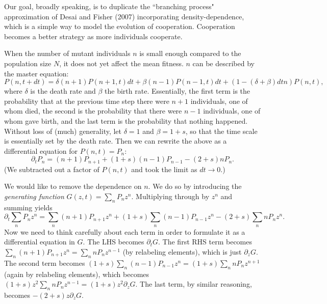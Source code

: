 \documentclass[10pt]{revtex4}
\begin{document}
Our goal, broadly speaking, is to duplicate the ``branching process" approximation of Desai and Fisher (2007) incorporating density-dependence, which is a simple way to model the evolution of cooperation.
Cooperation becomes a better strategy as more individuals cooperate.

When the number of mutant individuals $n$ is small enough compared to the population size $N$, it does not yet affect the mean fitness.
$n$ can be described by the master equation:
\begin{equation}
P(n,t+dt) = \delta(n+1)P(n+1,t)dt + \beta(n-1)P(n-1,t)dt + (1-(\delta + \beta)dt n)P(n,t),
\end{equation}
where $\delta$ is the death rate and $\beta$ the birth rate.
Essentially, the first term is the probability that at the previous time step there were $n+1$ individuals, one of whom died, the second is the probability that there were $n-1$ individuals, one of whom gave birth, and the last term is the probability that nothing happened.
Without loss of (much) generality, let $\delta = 1$ and $\beta = 1+s$, so that the time scale is essentially set by the death rate.
Then we can rewrite the above as a differential equation for $P(n,t) = P_n$:
\begin{equation}
\partial_t P_n = (n+1)P_{n+1} + (1+s)(n-1)P_{n-1} - (2+s) nP_n.
\end{equation}
(We subtracted out a factor of $P(n,t)$ and took the limit as $dt \to 0$.)

We would like to remove the dependence on $n$.
We do so by introducing the \emph{generating function} $G(z,t) = \sum_n P_n z^n$.
Multiplying through by $z^n$ and summing yields
\begin{equation}
\partial_t  \sum_n P_n z^n =  \sum_n (n+1)P_{n+1} z^n + (1+s) \sum_n (n-1)P_{n-1}z^n - (2+s)\sum_n nP_n z^n.
\end{equation}
Now we need to think carefully about each term in order to formulate it as a differential equation in $G$.
The LHS becomes $\partial_t G$.
The first RHS term becomes $\sum_n (n+1)P_{n+1} z^n = \sum_n n P_{n} z^{n-1}$ (by relabeling elements), which is just $\partial_z G$.
The second term becomes $(1+s) \sum_n (n-1)P_{n-1}z^n = (1+s) \sum_n n P_n z^{n+1}$ (again by relabeling elements), which becomes $(1+s)z^2 \sum_n n P_n z^{n-1} = (1+s) z^2 \partial_z G$.
The last term, by similar reasoning, becomes $-(2+s) z \partial_z G$.
\end{document}
